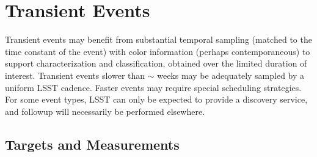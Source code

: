 
%
%
%
%
%
%

\section{Transient Events}
\def\secname{transients}\label{sec:\secname}



Transient events may benefit from substantial temporal sampling
(matched to the time constant of the event) with color information
(perhaps contemporaneous) to support characterization and
classification, obtained over the limited duration of interest.
Transient events slower than $\sim$ weeks may be adequately sampled by
a uniform LSST cadence.  Faster events may require special scheduling
strategies.  For some event types, LSST can only be expected to
provide a discovery service, and followup will necessarily be
performed elsewhere.


\subsection{Targets and Measurements}
\label{sec:\secname:targets}

